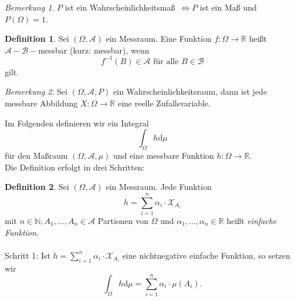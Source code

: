 \documentclass[a4paper,12pt,fleqn]{scrartcl}
\newcommand{\N}{\mathbb{N}}
\newcommand{\R}{\mathbb{R}}
\newcommand{\m}[1]{\mathcal{ #1 }}
\newcommand{\WR}{Wahrscheinlichkeitsraum}
\newcommand{\WM}{Wahrscheinlichkeitsmaß}
\theoremstyle{definition}
\newtheorem{definition}{Definition}[section]
\theoremstyle{plain}
\theoremstyle{remark}
\newtheorem*{bemerkung}{Bemerkung}
\begin{document}
\begin{bemerkung}
$P$ ist ein \WM \, $\Leftrightarrow P$ ist ein Maß und $P(\Omega)=1$.
\end{bemerkung}
\begin{definition}
Sei $(\Omega, \m{A})$ ein Messraum. Eine Funktion $f: \Omega \rightarrow \R$ heißt $\m{A}-\m{B}-$messbar (kurz: messbar), wenn
\[f^{-1}(B) \in \m{A} \text{ für alle } B \in \m{B}\]
gilt.
\end{definition}
\begin{bemerkung}
Sei $(\Omega, \m{A}, P)$ ein \WR, dann ist jede messbare Abbildung $X: \Omega \rightarrow \R$ eine reelle Zufallsvariable.
\end{bemerkung}
Im Folgenden definieren wir ein Integral 
\[\int_\Omega h \mathrm{d}\mu\]
für den Maßraum $(\Omega, \m{A}, \mu)$ und eine messbare Funktion $h: \Omega \rightarrow \R$.\\
Die Definition erfolgt in drei Schritten:
\begin{definition}
Sei $(\Omega, \m{A})$ ein Messraum. Jede Funktion
\[h = \sum_{i=1}^n \alpha_i \cdot \m{X}_{A_i}\]
mit $n \in \N, A_1, \ldots, A_n \in \m{A}$ Partionen von $\Omega$ und $\alpha_1, \ldots, \alpha_n \in \R$ heißt \emph{einfache Funktion}.\\
\\
Schritt 1: Ist $h = \sum_{i=1}^n \alpha_i \cdot \m{X}_{A_i}$ eine nichtnegative einfache Funktion, so setzen wir
\[\int_\Omega h \mathrm{d}\mu = \sum_{i=1}^n \alpha_i \cdot \mu(A_i).\]
\end{definition}
\end{document}
